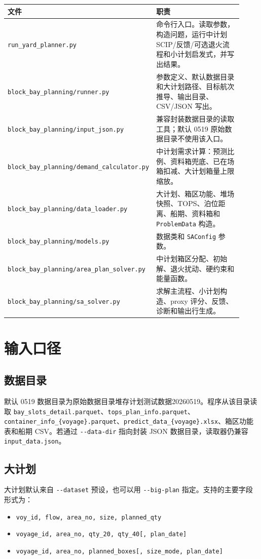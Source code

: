 \documentclass[UTF8,a4paper,11pt]{ctexart}
\newcommand{\code}[1]{\nolinkurl{#1}}
\begin{document}
\begin{longtable}{L{0.32\linewidth}L{0.60\linewidth}}
\toprule
文件 & 职责\\
\midrule
\code{run_yard_planner.py} & 命令行入口。读取参数，构造问题，运行中计划 SCIP/反馈/可选退火流程和小计划启发式，并写出结果。\\
\code{block_bay_planning/runner.py} & 参数定义、默认数据目录和大计划路径、目标航次推导、输出目录、CSV/JSON 写出。\\
\code{block_bay_planning/input_json.py} & 兼容封装数据目录的读取工具；默认 0519 原始数据目录不使用该入口。\\
\code{block_bay_planning/demand_calculator.py} & 中计划需求计算：预测比例、资料箱兜底、已在场箱扣减、大计划箱量上限缩放。\\
\code{block_bay_planning/data_loader.py} & 大计划、箱区功能、堆场快照、TOPS、泊位距离、船期、资料箱和 \code{ProblemData} 构造。\\
\code{block_bay_planning/models.py} & 数据类和 \code{SAConfig} 参数。\\
\code{block_bay_planning/area_plan_solver.py} & 中计划箱区分配、初始解、退火扰动、硬约束和能量函数。\\
\code{block_bay_planning/sa_solver.py} & 求解主流程、小计划构造、proxy 评分、反馈、诊断和输出行生成。\\
\bottomrule
\end{longtable}

\section{输入口径}

\subsection{数据目录}

默认 0519 数据目录为原始数据目录堆存计划测试数据20260519。程序从该目录读取 \code{bay_slots_detail.parquet}、\code{tops_plan_info.parquet}、\code{container_info_\{voyage\}.parquet}、\code{predict_data_\{voyage\}.xlsx}、箱区功能表和船期 CSV。若通过 \code{--data-dir} 指向封装 JSON 数据目录，读取器仍兼容 \code{input_data.json}。

\subsection{大计划}

大计划默认来自 \code{--dataset} 预设，也可以用 \code{--big-plan} 指定。支持的主要字段形式为：
\begin{itemize}
  \item \code{voy_id, flow, area_no, size, planned_qty}
  \item \code{voyage_id, area_no, qty_20, qty_40[, plan_date]}
  \item \code{voyage_id, area_no, planned_boxes[, size_mode, plan_date]}
\end{itemize}
\end{document}
